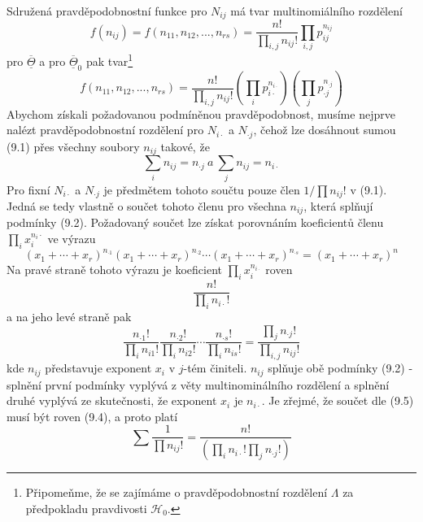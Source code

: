 Sdružená pravděpodobnostní funkce pro $N_{ij}$ má tvar multinomiálního rozdělení
\begin{equation*}
f(n_{ij}) = f(n_{11}, n_{12}, ..., n_{rs}) = \frac{n!}{\prod_{i,j}n_{ij}!}\prod_{i,j}p_{ij}^{n_{ij}}
\end{equation*}
pro $\overline{\underline{\Theta}}$ a pro $\overline{\underline{\Theta}}_0$ pak tvar\footnote{Připomeňme, že se zajímáme o pravděpodobnostní rozdělení $\Lambda$ za předpokladu pravdivosti $\mathscr{H}_0$.}
\begin{equation}
f(n_{11}, n_{12}, ..., n_{rs}) = \frac{n!}{\prod_{i,j}n_{ij}!} \left(\prod_i p_{i \cdot}^{n_{i \cdot}}\right)\left(\prod_j p_{\cdot j}^{n_{\cdot j}}\right)
\end{equation}
Abychom získali požadovanou podmíněnou pravděpodobnost, musíme nejprve nalézt pravděpodobnostní rozdělení pro $N_{i \cdot}$ a $N_{\cdot j}$, čehož lze dosáhnout sumou (9.1) přes všechny soubory $n_{ij}$ takové, že
\begin{equation}
\sum_i n_{ij} = n_{\cdot j} ~ \textit{a} ~ \sum_j n_{ij} = n_{i \cdot}
\end{equation}
Pro fixní $N_{i \cdot}$ a $N_{\cdot j}$ je předmětem tohoto součtu pouze člen $1/\prod n_{ij}!$ v (9.1). Jedná se tedy vlastně o součet tohoto členu pro všechna $n_{ij}$, která splňují podmínky (9.2). Požadovaný součet lze získat porovnáním koeficientů členu $\prod_i x_i^{n_i \cdot}$ ve výrazu
\begin{equation}
(x_1 + \cdots + x_r)^{n_{\cdot 1}}(x_1 + \cdots + x_r)^{n_{\cdot 2}}\cdots(x_1 + \cdots + x_r)^{n_{\cdot s}} = (x_1 + \cdots + x_r)^n
\end{equation}
Na pravé straně tohoto výrazu je koeficient $\prod_i x_i^{n_{i \cdot}}$ roven
\begin{equation}
\frac{n!}{\prod_i n_{i \cdot}!}
\end{equation}
a na jeho levé straně pak
\begin{equation}
\frac{n_{\cdot 1}!}{\prod_i n_{i 1}!}\frac{n_{\cdot 2}!}{\prod_i n_{i 2}!} \cdots \frac{n_{\cdot s}!}{\prod_i n_{i s}!} = \frac{\prod_j n_{\cdot j}!}{\prod_{i,j}n_{ij}!}
\end{equation}
kde $n_{ij}$ představuje exponent $x_i$ v $j$-tém činiteli. $n_{ij}$ splňuje obě podmínky (9.2) - splnění první podmínky vyplývá z věty multinominálního rozdělení a splnění druhé vyplývá ze skutečnosti, že exponent $x_i$ je $n_{i \cdot}$. Je zřejmé, že součet dle (9.5) musí být roven (9.4), a proto platí
\begin{equation*}
\sum \frac{1}{\prod n_{ij}!} = \frac{n!}{\left(\prod_i n_{i \cdot}! \prod_j n_{\cdot j}!\right)}
\end{equation*}
